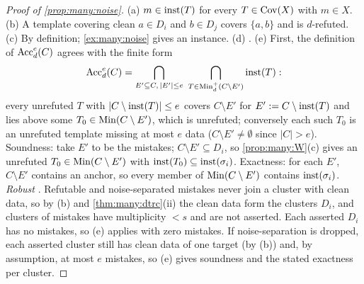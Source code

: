 \begin{proof}[Proof of \cref{prop:many:noise}]
(a) $m\in\mathrm{inst}(T)$ for every $T\in\mathrm{Cov}(X)$ with $m\in X$. (b) A template covering clean $a\in D_i$ and $b\in D_j$ covers
$\{a,b\}$ and is $d$-refuted. (c) By definition; \cref{ex:many:noise} gives an instance. (d) .
(e) First, the definition of $\mathrm{Acc}^e_d(C)$ agrees with the finite form
\[\mathrm{Acc}^e_d(C)=\bigcap_{E'\subseteq C,\,|E'|\le e}\ \bigcap_{T\in\mathrm{Min}^+_d(C\setminus E')}\mathrm{inst}(T):\]
every unrefuted $T$ with $|C\setminus\mathrm{inst}(T)|\le e$ covers $C\setminus E'$ for $E':=C\setminus\mathrm{inst}(T)$ and lies above some
$T_0\in\mathrm{Min}(C\setminus E')$, which is unrefuted; conversely each such $T_0$ is an unrefuted template missing at most $e$
data ($C\setminus E'\neq\emptyset$ since $|C|>e$). Soundness: take $E'$ to be the mistakes; $C\setminus E'\subseteq D_i$, so
\cref{prop:many:W}(c) gives an unrefuted $T_0\in\mathrm{Min}(C\setminus E')$ with $\mathrm{inst}(T_0)\subseteq\mathrm{inst}(\sigma_i)$. Exactness: for
each $E'$, $C\setminus E'$ contains an anchor, so every member of $\mathrm{Min}(C\setminus E')$ contains $\mathrm{inst}(\sigma_i)$.
\emph{Robust} \textup{\DTRC}. Refutable and noise-separated mistakes never join a cluster with clean data, so by (b) and
\cref{thm:many:dtrc}(ii) the clean data form the clusters $D_i$, and clusters of mistakes have multiplicity $<s$ and are not
asserted. Each asserted $D_i$ has no mistakes, so (e) applies with zero mistakes. If noise-separation is dropped, each
asserted cluster still has clean data of one target (by (b)) and, by assumption, at most $e$ mistakes, so (e) gives
soundness and the stated exactness per cluster.
\end{proof}

